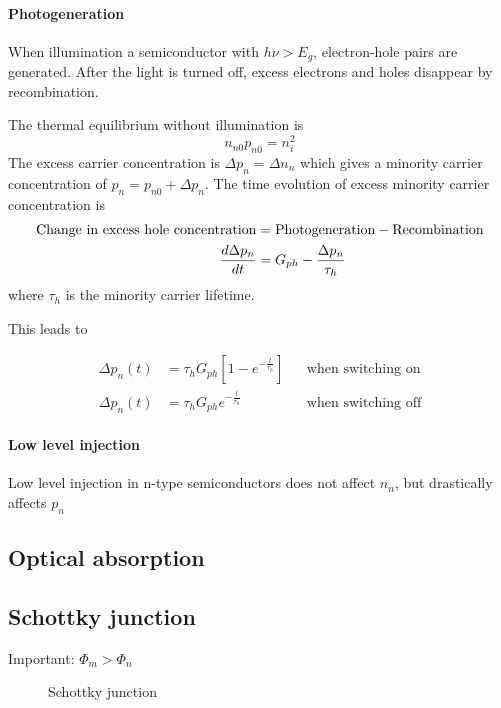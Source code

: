 \paragraph{Photogeneration}
When illumination a semiconductor with $h\nu > E_g$, electron-hole pairs are generated.
After the light is turned off, excess electrons and holes disappear by recombination.

The thermal equilibrium without illumination is
\begin{equation}
    n_{n0} p_{n0} = n_i^2
\end{equation}
The excess carrier concentration is $\Delta p_n = \Delta n_n$ which gives
a minority carrier concentration of $p_n = p_{n0} + \Delta p_n$.
The time evolution of excess minority carrier concentration is
\begin{align}
    \text{Change in excess hole concentration} &= \text{Photogeneration} - \text{Recombination} \notag \\
    \frac{d \Delta p_n}{dt} &= G_{ph} - \frac{\Delta p_n}{\tau_h}
\end{align}
where $\tau_h$ is the minority carrier lifetime. 

This leads to

\begin{align}
    \Delta p_n(t) &= \tau_h G_{ph} \left[ 1-e^{-\frac{t}{\tau_h}} \right] && \text{when switching on}\\
    \Delta p_n(t) &= \tau_h G_{ph} e^{-\frac{t}{\tau_h}} && \text{when switching off}    
\end{align}

\paragraph{Low level injection}
Low level injection in n-type semiconductors does not affect $n_n$, but drastically affects $p_n$

\subsection{Optical absorption}

\subsection{Schottky junction}

Important: $\Phi_m > \Phi_n$

\begin{figure}[ht!]
    \centering
    
    \caption{Schottky junction}
\end{figure}

